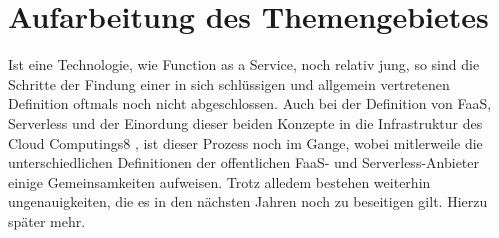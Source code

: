 \documentclass[11pt]{article}
\begin{document}
\section{Aufarbeitung des Themengebietes}
Ist eine Technologie, wie Function as a Service, noch relativ jung, so sind die Schritte der Findung einer in sich schlüssigen und allgemein vertretenen Definition oftmals noch nicht abgeschlossen. Auch bei der Definition von FaaS, Serverless und der Einordung dieser beiden Konzepte in die Infrastruktur des Cloud Computings8  \cite{mell2011nist}, ist dieser Prozess noch im Gange, wobei mitlerweile die unterschiedlichen Definitionen der offentlichen FaaS- und Serverless-Anbieter einige Gemeinsamkeiten aufweisen. Trotz alledem bestehen weiterhin ungenauigkeiten, die es in den nächsten Jahren noch zu beseitigen gilt. Hierzu später mehr. \\\\
\end{document}
